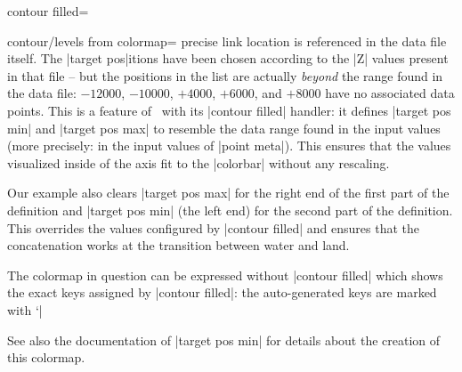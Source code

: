 {{\begin{plottype}[/pgfplots]{
    contour filled=\textcolor{black}{}%
}
\begin{pgfplotskey}{contour/levels from colormap=}
{        precise link location is referenced in the data file itself.} The |target pos|itions have been chosen according to the |Z| values present in that file -- but the positions in the list are actually \emph{beyond} the range found in the data file: $-12000$, $-10000$, $+4000$, $+6000$, and $+8000$ have no associated data points. This is a feature of \PGFPlots\ with its |contour filled| handler: it defines |target pos min| and |target pos max| to resemble the data range found in the input values (more precisely: in the input values of |point meta|). This ensures that the values visualized inside of the axis fit to the |colorbar| without any rescaling.
		
		Our example also clears |target pos max| for the right
        end of the first part of the definition and |target pos min| (the
        left end) for the second part of the definition. This overrides the values configured by |contour filled| and ensures that the concatenation works at the transition between water and land. 
		

		The colormap in question can be expressed without |contour filled| which shows the exact keys assigned by |contour filled|: the auto-generated keys are marked with `|%

\begin{codeexample}[]
\pgfplotscolorbardrawstandalone[
    colormap={whiteblue}{color=(blue) color=(white)},
    colormap={gb}{color=(green)
        color=(yellow) color=(brown)},
    colorbar style={minor x tick num=1},
    point meta min=-7052,  %
    point meta max=2895,   %
    of colormap/target pos min*=-7052, %
    of colormap/target pos max*=2895,  %
    of colormap/sample for=const, %
    colormap access=const,        %
    colormap={CM}{
        of colormap={
            whiteblue,
            target pos max=,
            target pos={-12000,-10000,-6000,-5000,
              -3000,-1000,-750,-500,-250,-100,-50,0}
        },
        of colormap={
            gb,
            target pos min=,
            target pos={10,100,200,500,1000,1100,
                1200,1500,2000,4000,6000,8000}
        },
    },
]
\end{codeexample}
	\noindent See also the documentation of |target pos min| for details about the creation of this colormap.


\end{pgfplotskey}
\end{plottype}}}
